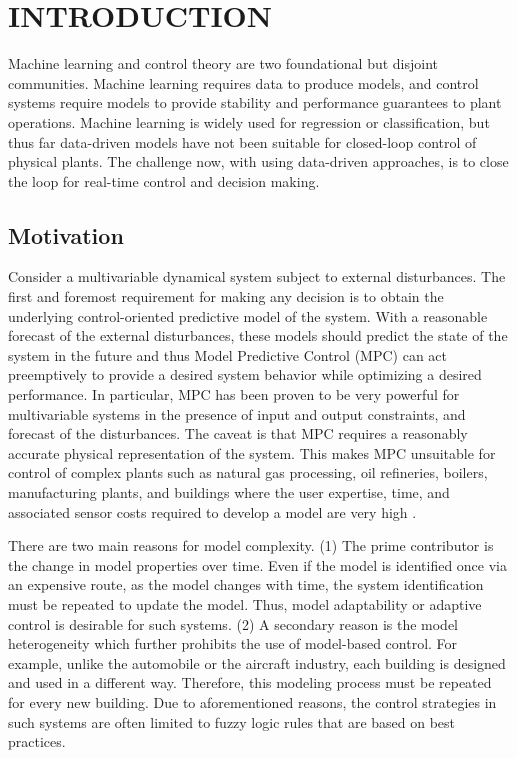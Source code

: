 \section{INTRODUCTION}
\label{S:intro}

Machine learning and control theory are two foundational but disjoint communities. Machine learning requires data to produce models, and control systems require models to provide stability and performance guarantees to plant operations. Machine learning is widely used for regression or classification, but thus far data-driven models have not been suitable for closed-loop control of physical plants. The challenge now, with using data-driven approaches, is to close the loop for real-time control and decision making.

\subsection{Motivation}
Consider a multivariable dynamical system subject to external disturbances. The first and foremost requirement for making any decision is to obtain the underlying control-oriented predictive model of the system. With a reasonable forecast of the external disturbances, these models should predict the state of the system in the future and thus Model Predictive Control (MPC) can act preemptively to provide a desired system behavior while optimizing a desired performance. In particular, MPC has been proven to be very powerful for multivariable systems in the presence of input and output constraints, and forecast of the disturbances. The caveat is that MPC requires a reasonably accurate physical representation of the system. This makes MPC unsuitable for control of complex plants such as natural gas processing, oil refineries, boilers, manufacturing plants, and buildings where the user expertise, time, and associated sensor costs required to develop a model are very high \cite{Sturzenegger2016,vzavcekova2014}.

There are two main reasons for model complexity. 
(1) The prime contributor is the change in model properties over time. Even if the model is identified once via an expensive route, as the model changes with time, the system identification must be repeated to update the model. Thus, model adaptability or adaptive control is desirable for such systems. 
(2) A secondary reason is the model heterogeneity which further prohibits the use of model-based control. For example, unlike the automobile or the aircraft industry, each building is designed and used in a different way. Therefore, this modeling process must be repeated for every new building. 
Due to aforementioned reasons, the control strategies in such systems are often limited to fuzzy logic rules that are based on best practices. 


